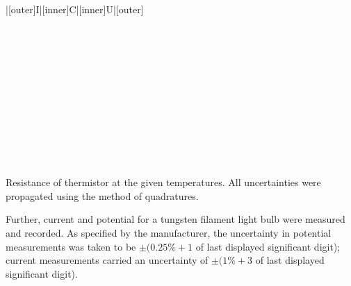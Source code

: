 \begin{paper}
{\begin{papertable}{|[outer]I|[inner]C|[inner]U|[outer]}
			\papertableindex{}\\\paperiline
			\papertableindex{}\\\paperiline
			\papertableindex{}\\\paperiline
			\papertableindex{}\\\paperiline
			\papertableindex{}\\\paperiline
			\papertableindex{}\\\paperiline
			\papertableindex{}\\\paperiline
			\papertableindex{}\\\paperiline
			\papertableindex{}\\\paperiline
			\papertableindex{}\\\paperiline
			\papertableindex{}\\\paperiline
			\papertableindex{}\\\paperoline
		\end{papertable}\vspace{-1.5em}}
	{Resistance of thermistor at the given temperatures. All uncertainties were propagated using the method of quadratures.}\vspace{1em}
	
	Further, current and potential for a tungsten filament light bulb were measured and recorded. As specified by the manufacturer, the uncertainty in potential measurements was taken to be \( \pm (0.25\% + 1 \) of last displayed significant digit); current measurements carried an uncertainty of \( \pm (1\% + 3 \) of last displayed significant digit). \vspace{1em}


\end{paper}
